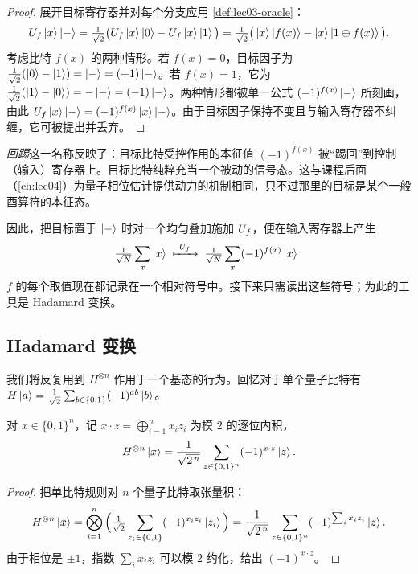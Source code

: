 \begin{proof}
展开目标寄存器并对每个分支应用 \cref{def:lec03-oracle}：
\[
  U_{f}\ket{x}\ket{-}
  =\tfrac{1}{\sqrt2}\big(U_{f}\ket{x}\ket{0}-U_{f}\ket{x}\ket{1}\big)
  =\tfrac{1}{\sqrt2}\big(\ket{x}\ket{f(x)}-\ket{x}\ket{1\oplus f(x)}\big).
\]
考虑比特 $f(x)$ 的两种情形。若 $f(x)=0$，目标因子为 $\tfrac{1}{\sqrt2}(\ket{0}-\ket{1})=\ket{-}=(+1)\ket{-}$。若 $f(x)=1$，它为 $\tfrac{1}{\sqrt2}(\ket{1}-\ket{0})=-\ket{-}=(-1)\ket{-}$。两种情形都被单一公式 $(-1)^{f(x)}\ket{-}$ 所刻画，由此 $U_{f}\ket{x}\ket{-}=(-1)^{f(x)}\ket{x}\ket{-}$。由于目标因子保持不变且与输入寄存器不纠缠，它可被提出并丢弃。
\end{proof}

\begin{remark}
\label{rem:lec03-kickback}
\emph{回踢}这一名称反映了：目标比特受控作用的本征值 $(-1)^{f(x)}$ 被“踢回”到控制（输入）寄存器上。目标比特纯粹充当一个被动的信号态。这与课程后面（\cref{ch:lec04}）为量子相位估计提供动力的机制相同，只不过那里的目标是某个一般酉算符的本征态。
\end{remark}

因此，把目标置于 $\ket{-}$ 时对一个均匀叠加施加 $U_{f}$，便在输入寄存器上产生
\[
  \tfrac{1}{\sqrt{N}}\sum_{x}\ket{x}\;\xmapsto{\ \Uf\ }\;
  \tfrac{1}{\sqrt{N}}\sum_{x}(-1)^{f(x)}\ket{x}.
\]
$f$ 的每个取值现在都记录在一个相对符号中。接下来只需读出这些符号；为此的工具是 Hadamard 变换。

\subsection{Hadamard 变换}

我们将反复用到 $H^{\otimes n}$ 作用于一个基态的行为。回忆对于单个量子比特有 $H\ket{a}=\tfrac{1}{\sqrt2}\sum_{b\in\{0,1\}}(-1)^{ab}\ket{b}$。

\begin{lemma}
\label{lem:lec03-had}
对 $x\in\{0,1\}^n$，记 $x\cdot z=\bigoplus_{i=1}^{n}x_i z_i$ 为模 $2$ 的逐位内积，
\[
  H^{\otimes n}\ket{x}=\frac{1}{\sqrt{2^{\,n}}}\sum_{z\in\{0,1\}^n}(-1)^{x\cdot z}\ket{z}.
\]
\end{lemma}

\begin{proof}
把单比特规则对 $n$ 个量子比特取张量积：
\[
  H^{\otimes n}\ket{x}
  =\bigotimes_{i=1}^{n}\Big(\tfrac{1}{\sqrt2}\sum_{z_i\in\{0,1\}}(-1)^{x_i z_i}\ket{z_i}\Big)
  =\frac{1}{\sqrt{2^{\,n}}}\sum_{z\in\{0,1\}^n}(-1)^{\sum_i x_i z_i}\ket{z}.
\]
由于相位是 $\pm1$，指数 $\sum_i x_i z_i$ 可以模 $2$ 约化，给出 $(-1)^{x\cdot z}$。
\end{proof}

